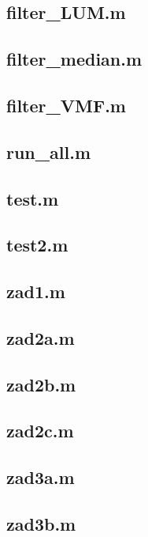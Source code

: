 \subsection*{ filter\_LUM.m       } \newpage
\subsection*{ filter\_median.m    } \newpage
\subsection*{ filter\_VMF.m       } \newpage
\subsection*{ run\_all.m          } \newpage
\subsection*{ test.m              } \newpage
\subsection*{ test2.m             } \newpage
\subsection*{ zad1.m              } \newpage
\subsection*{ zad2a.m             } \newpage
\subsection*{ zad2b.m             } \newpage
\subsection*{ zad2c.m             } \newpage
\subsection*{ zad3a.m             } \newpage
\subsection*{ zad3b.m             } \newpage





